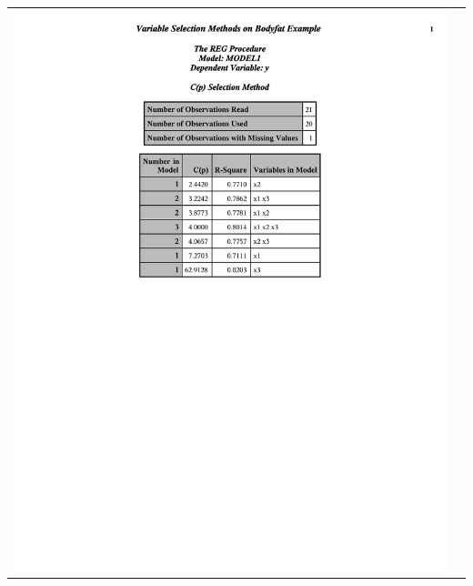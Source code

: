 \begin{center}
\begin{tabular}{cc}
\includegraphics[page=2,scale=0.6,trim=40mm 30mm 20mm 10mm]{bodyfatexampleselection}\\
\end{tabular}
\begin{tabular}{cc}

\end{tabular}
\end{center}
